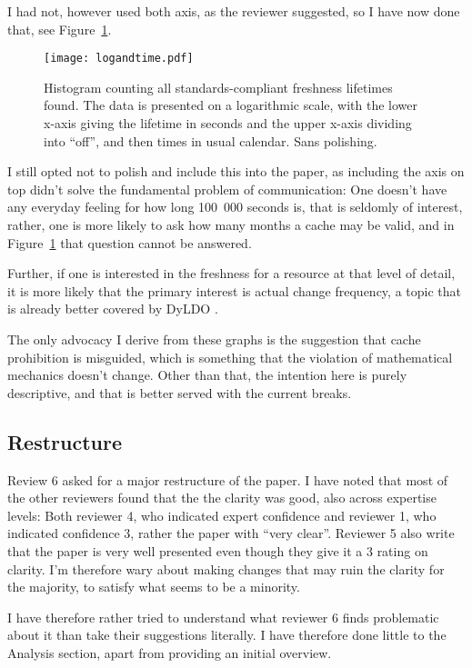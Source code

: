 \documentclass{article}
\begin{document}
I had not, however used both axis, as the reviewer suggested, so I
have now done that, see Figure~\ref{fig:log}.

\begin{figure}[h!]
  \centerline{%
    \texttt{[image: logandtime.pdf]}}
  \caption{Histogram counting all standards-compliant freshness
    lifetimes found. The data is presented on a logarithmic scale,
    with the lower x-axis giving the lifetime in seconds and the upper
    x-axis dividing into ``off'', and then times in usual
    calendar. Sans polishing.}
  \label{fig:log}
\end{figure}

I still opted not to polish and include this into the paper, as
including the axis on top didn't solve the fundamental problem of
communication: One doesn't have any everyday feeling for how long
100~000 seconds is, that is seldomly of interest, rather, one is more
likely to ask how many months a cache may be valid, and in
Figure~\ref{fig:log} that question cannot be answered. 

Further, if one is interested in the freshness for a resource at that
level of detail, it is more likely that the primary interest is actual
change frequency, a topic that is already better covered by DyLDO \cite{dyldo2}.

The only advocacy I derive from these graphs is the suggestion that
cache prohibition is misguided, which is something that the violation
of mathematical mechanics doesn't change. Other than that, the
intention here is purely descriptive, and that is better served with
the current breaks.

\subsection{Restructure}\label{restructure} 

Review 6 asked for a major restructure of the paper. I have noted that
most of the other reviewers found that the the clarity was good, also
across expertise levels: Both reviewer 4, who indicated expert
confidence and reviewer 1, who indicated confidence 3, rather the
paper with ``very clear''. Reviewer 5 also write that the paper is
very well presented even though they give it a 3 rating on
clarity. I'm therefore wary about making changes that may ruin the
clarity for the majority, to satisfy what seems to be a minority.

I have therefore rather tried to understand what reviewer 6 finds
problematic about it than take their suggestions literally. I have
therefore done little to the Analysis section, apart from providing an
initial overview. 
\end{document}
